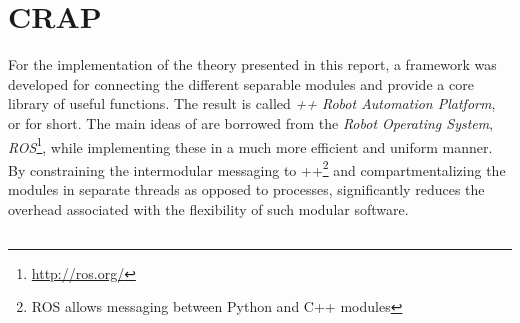 \chapter{CRAP}
\label{app:crap}
    For the implementation of the theory presented in this report, a
    framework was developed for connecting the different separable modules
    and provide a core library of useful functions.
    The result is called \textit{\C++ Robot Automation Platform}, or \crap for short.
    The main ideas of \crap are borrowed from the \textit{Robot Operating System}, \textit{ROS}\footnote{\url{http://ros.org/}},
    while implementing these in a much more efficient and uniform manner.
    By constraining the intermodular messaging to \C++\footnote{ROS allows messaging between Python and C++ modules} and compartmentalizing the
    modules in separate threads as opposed to processes, \crap significantly
    reduces the overhead associated with the flexibility of such modular software.

    \section{}
